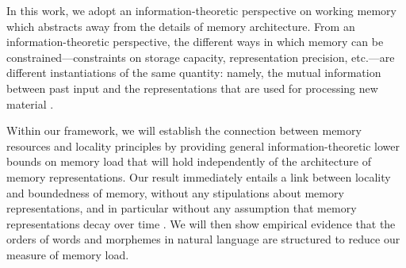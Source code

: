 In this work, we adopt an information-theoretic perspective on working memory which abstracts away from the details of memory architecture.
From an information-theoretic perspective, the different ways in which memory can be constrained---constraints on storage capacity, representation precision, etc.---are different instantiations of the same quantity: namely, the mutual information between past input and the representations that are used for processing new material \citep{still-information-2014}.

Within our framework, we will establish the connection between memory resources and locality principles by providing general information-theoretic lower bounds on memory load that will hold independently of the architecture of memory representations.
Our result immediately entails a link between locality and boundedness of memory, without any stipulations about memory representations, and in particular without any assumption that memory representations decay over time \citep[as was required in][]{gibson-linguistic-1998, lewis-activation-based-2005, futrell-noisy-context-2017}.
We will then show empirical evidence that the orders of words and morphemes in natural language are structured to reduce our measure of memory load.




